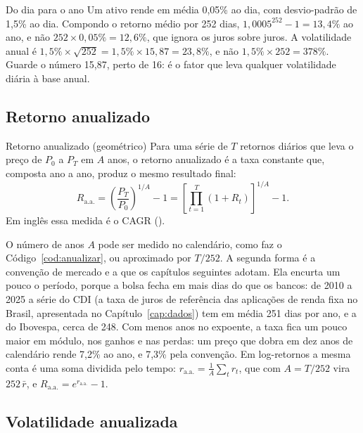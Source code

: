 \begin{exemplo}{Do dia para o ano}
Um ativo rende em média 0,05\% ao dia, com desvio-padrão de 1,5\% ao dia. Compondo o retorno médio por 252 dias, $1,0005^{252} - 1 = 13,4\%$ ao ano, e não $252 \times 0,05\% = 12,6\%$, que ignora os juros sobre juros. A volatilidade anual é $1,5\% \times \sqrt{252} = 1,5\% \times 15,87 = 23,8\%$, e não $1,5\% \times 252 = 378\%$. Guarde o número 15,87, perto de 16: é o fator que leva qualquer volatilidade diária à base anual.
\end{exemplo}

\subsection{Retorno anualizado}

\begin{definicao}{Retorno anualizado (geométrico)}
Para uma série de $T$ retornos diários que leva o preço de $P_0$ a $P_T$ em $A$ anos, o retorno anualizado é a taxa constante que, composta ano a ano, produz o mesmo resultado final:
\begin{equation}
  R_{\text{a.a.}} = \left(\frac{P_T}{P_0}\right)^{1/A} - 1 = \left[\prod_{t=1}^{T}(1+R_t)\right]^{1/A} - 1 .
  \label{eq:cagr}
\end{equation}
Em inglês essa medida é o CAGR ().
\end{definicao}

O número de anos $A$ pode ser medido no calendário, como faz o Código~\ref{cod:anualizar}, ou aproximado por $T/252$. A segunda forma é a convenção de mercado e a que os capítulos seguintes adotam. Ela encurta um pouco o período, porque a bolsa fecha em mais dias do que os bancos: de 2010 a 2025 a série do CDI (a taxa de juros de referência das aplicações de renda fixa no Brasil, apresentada no Capítulo~\ref{cap:dados}) tem em média 251 dias por ano, e a do Ibovespa, cerca de 248. Com menos anos no expoente, a taxa fica um pouco maior em módulo, nos ganhos e nas perdas: um preço que dobra em dez anos de calendário rende 7,2\% ao ano, e 7,3\% pela convenção. Em log-retornos a mesma conta é uma soma dividida pelo tempo: $r_{\text{a.a.}} = \frac{1}{A}\sum_t r_t$, que com $A = T/252$ vira $252\,\bar r$, e $R_{\text{a.a.}} = e^{r_{\text{a.a.}}} - 1$.

\subsection{Volatilidade anualizada}

